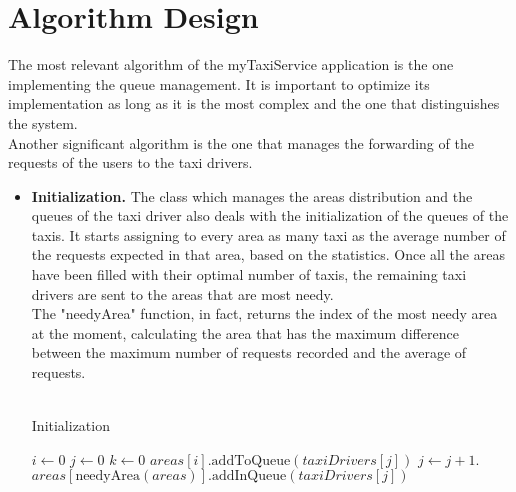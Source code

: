 \documentclass[18pt,oneside,a4paper, titlepage]{article}
\begin{document}
	\newpage
	
	\section{Algorithm Design}
		The most relevant algorithm of the myTaxiService application is the one implementing the queue management. It is important to optimize its implementation as long as it is the most complex and the one that distinguishes the system.\\
		Another significant algorithm is the one that manages the forwarding of the requests of the users to the taxi drivers.
		\begin{itemize}
			\item \textbf{Initialization.} The class which manages the areas distribution and the queues of the taxi driver also deals with the initialization of the queues of the taxis. It starts assigning to every area as many taxi as the average number of the requests expected in that area, based on the statistics. Once all the areas have been filled with their optimal number of taxis, the remaining taxi drivers are sent to the areas that are most needy.\\The "needyArea" function, in fact, returns the index of the most needy area at the moment, calculating the area that has the maximum difference between the maximum number of requests recorded and the average of requests.\\
			 \\
			
			
			\begin{algorithm}
				\caption{Initialization}
				\begin{algorithmic}[1]
					\State $i \gets \textit{0}$
					\State $j \gets \textit{0}$
						\State $k \gets \textit{0}$
								\State $areas[i].\text{addToQueue}(taxiDrivers[j])$
								\State $j \gets j+1$.
								\EndFor
						\EndFor
							\State $areas[\text{needyArea} (areas)].\text{addInQueue}(taxiDrivers[j])$
						\EndFor
					\EndIf
					\EndProcedure
				\end{algorithmic}
			\end{algorithm}
			

\end{itemize}
\end{document}
